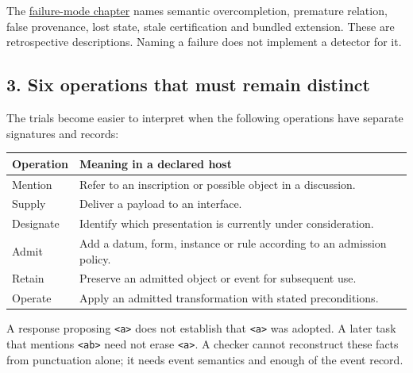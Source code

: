 \documentclass[
  11pt,
]{article}
\begin{document}
The
\href{docs/sources/pre_genesis/04_named_failure_modes.txt}{failure-mode
chapter} names semantic overcompletion, premature relation, false
provenance, lost state, stale certification and bundled extension. These
are retrospective descriptions. Naming a failure does not implement a
detector for it.

\subsection{3. Six operations that must remain
distinct}\label{six-operations-that-must-remain-distinct}

The trials become easier to interpret when the following operations have
separate signatures and records:

\begin{longtable}[]{@{}
  >{\raggedright\arraybackslash}p{}
  >{\raggedright\arraybackslash}p{}@{}}
\toprule\noalign{}
\begin{minipage}[b]{\linewidth}\raggedright
Operation
\end{minipage} & \begin{minipage}[b]{\linewidth}\raggedright
Meaning in a declared host
\end{minipage} \\
\midrule\noalign{}
\endhead
\bottomrule\noalign{}
\endlastfoot
Mention & Refer to an inscription or possible object in a discussion. \\
Supply & Deliver a payload to an interface. \\
Designate & Identify which presentation is currently under
consideration. \\
Admit & Add a datum, form, instance or rule according to an admission
policy. \\
Retain & Preserve an admitted object or event for subsequent use. \\
Operate & Apply an admitted transformation with stated preconditions. \\
\end{longtable}

A response proposing \texttt{\textless{}a\textgreater{}} does not
establish that \texttt{\textless{}a\textgreater{}} was adopted. A later
task that mentions \texttt{\textless{}ab\textgreater{}} need not erase
\texttt{\textless{}a\textgreater{}}. A checker cannot reconstruct these
facts from punctuation alone; it needs event semantics and enough of the
event record.
\end{document}
